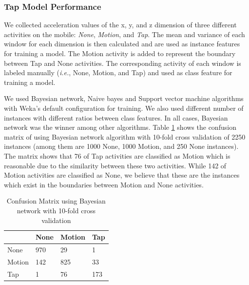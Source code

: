 \subsubsection{Tap Model Performance}
We collected acceleration values of the x, y, and z dimension of three different activities on the mobile: \emph{None}, \emph{Motion}, and \emph{Tap}. The mean and variance of each window for each dimension is then calculated and are used as instance features for training a model. The Motion activity is added to represent the boundary between Tap and None activities.  The corresponding activity of each window is labeled manually (\emph{i.e.}, None, Motion, and Tap) and used as class feature for training a model. 
\par
We used Bayesian network, Naive bayes and Support vector machine algorithms with Weka's default configuration for training. We also used different number of instances with different ratios between class features. In all cases, Bayesian network was the winner among other algorithms. Table \ref{tbl-Confusion Matrix} shows the confusion matrix of using Bayesian network algorithm with 10-fold cross validation of 2250 instances (among them are 1000 None, 1000 Motion, and 250 None instances). The matrix shows that 76 of Tap activities are classified as Motion which is reasonable due to the similarity between these two activities. While 142 of Motion activities are classified as None, we believe that these are the instances which exist in the boundaries between Motion and None activities.

\begin{table}[!t]
\begin{center}
\caption{Confusion Matrix using Bayesian network with 10-fold cross validation}
\label{tbl-Confusion Matrix}
\begin{tabular}{|l||l|l|l|}\hline
        & None   & Motion   & Tap   \\ \hline \hline
None    & 970    &	29      & 1	    \\
Motion  & 142    &	825     & 33    \\
Tap     & 1      &	76      & 173	\\ \hline
\end{tabular}
\end{center}
\end{table}

